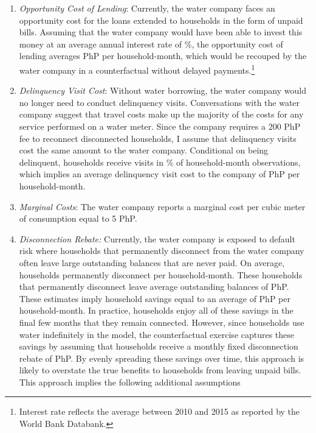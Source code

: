 \documentclass[12pt]{article}
\begin{document}
\begin{enumerate}
\item \textit{Opportunity Cost of Lending}: Currently, the water company faces an opportunity cost for the loans extended to households in the form of unpaid bills.  Assuming that the water company would have been able to invest this money at an average annual interest rate of \unskip\%, the opportunity cost of lending averages PhP per household-month, which would be recouped by the water company in a counterfactual without delayed payments.\footnote{Interest rate reflects the average between 2010 and 2015 as reported by the World Bank Databank.}

\item \textit{Delinquency Visit Cost}: Without water borrowing, the water company would no longer need to conduct delinquency visits.  Conversations with the water company suggest that travel costs make up the majority of the costs for any service performed on a water meter.  Since the company requires a 200 PhP fee to reconnect disconnected households, I assume that delinquency visits cost the same amount to the water company.  Conditional on being delinquent, households receive visits in \unskip\% of household-month observations, which implies an average delinquency visit cost to the company of PhP per household-month. 

\item \textit{Marginal Costs}: The water company reports a marginal cost per cubic meter of consumption equal to 5 PhP.

\item \textit{Disconnection Rebate:}  Currently, the water company is exposed to default risk where households that permanently disconnect from the water company often leave large outstanding balances that are never paid.  On average, households permanently disconnect per household-month.  These households that permanently disconnect leave average outstanding balances of PhP.  These estimates imply household savings equal to an average of PhP per household-month.  In practice, households enjoy all of these savings in the final few months that they remain connected.  However, since households use water indefinitely in the model, the counterfactual exercise captures these savings by assuming that households receive a monthly fixed disconnection rebate of PhP.  By evenly spreading these savings over time, this approach is likely to overstate the true benefits to households from leaving unpaid bills.  This approach implies the following additional assumptions
\begin{itemize}


\end{itemize}
\end{enumerate}
\end{document}
